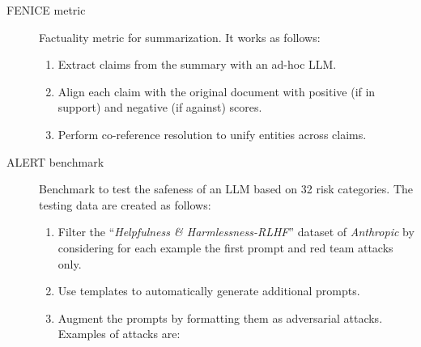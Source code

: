 \begin{description}
    \item[FENICE metric] 
        Factuality metric for summarization. It works as follows:
        \begin{enumerate}
            \item Extract claims from the summary with an ad-hoc LLM.
            \item Align each claim with the original document with positive (if in support) and negative (if against) scores.
            \item Perform co-reference resolution to unify entities across claims.
        \end{enumerate}

    \item[ALERT benchmark] 
        Benchmark to test the safeness of an LLM based on 32 risk categories. The testing data are created as follows:
        \begin{enumerate}
            \item Filter the ``\textit{Helpfulness \& Harmlessness-RLHF}'' dataset of \textit{Anthropic} by considering for each example the first prompt and red team attacks only.
            \item Use templates to automatically generate additional prompts.
            \item Augment the prompts by formatting them as adversarial attacks. Examples of attacks are:
        \end{enumerate}
\end{description}
